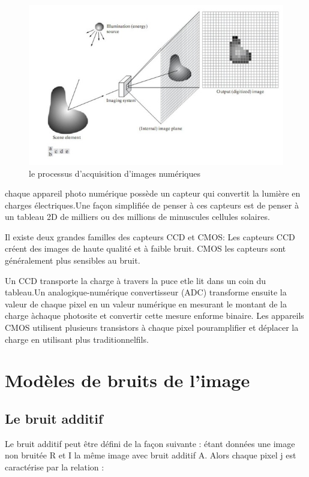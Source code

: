 \documentclass[12pt,a4paper]{report}
\numberwithin{equation}{subsection}
\numberwithin{equation}{section}
\begin{document}
\begin{figure}[h!]
    \centering
    \includegraphics[width=.9\textwidth]{m.jpg}
   
     \caption{le processus d'acquisition d'images numériques}
\end{figure}
\newline
chaque appareil photo numérique possède un capteur qui convertit la lumière en charges électriques.Une façon simplifiée de penser à ces capteurs est de penser à un tableau 2D de milliers ou des millions de minuscules cellules solaires.
\newline

Il existe deux grandes familles des capteurs CCD et CMOS:\newline
Les capteurs CCD créent des images de haute qualité et à faible bruit.\newline
CMOS les capteurs sont généralement plus sensibles au bruit.
\newline

Un CCD transporte la charge à travers la puce etle lit dans un coin du tableau.Un analogique-numérique convertisseur (ADC) transforme 
ensuite la valeur de chaque pixel en un valeur numérique en mesurant le montant de la charge àchaque photosite et convertir cette mesure enforme binaire.\newline
Les appareils CMOS utilisent plusieurs transistors à chaque pixel pouramplifier et déplacer la charge en utilisant plus traditionnelfils.



\newpage
\section{Modèles de bruits de l’image}
\subsection{Le bruit additif}
Le bruit additif peut être défini de la façon suivante : étant données une image non bruitée R et I la même image avec bruit additif A.\newline
Alors chaque pixel j est caractérise par la relation : 
\end{document}
